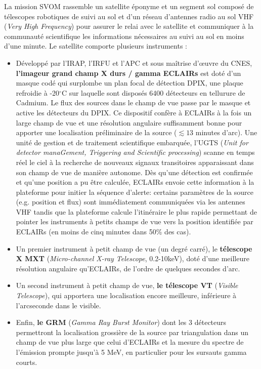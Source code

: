 \documentclass[11pt,onecolumn]{article}
\makeatletter
\newcommand*{\eg}{e.g.\@\xspace}
\makeatother
\begin{document}
La mission SVOM rassemble un satellite éponyme et un segment sol composé de télescopes robotiques de suivi au sol et d'un réseau d'antennes radio au sol VHF (\textit{Very High Frequency}) pour assurer le relai avec le satellite et communiquer à la communauté scientifique les informations nécessaires au suivi au sol en moins d'une minute. Le satellite comporte plusieurs instruments :

\begin{itemize}
\setlength\itemsep{0em}
\item Développé par l'IRAP, l'IRFU et l'APC et sous ma\^itrise d'\oe uvre du CNES, \textbf{l'imageur grand champ X durs / gamma ECLAIRs} est doté d'un masque codé qui surplombe un plan focal de détection DPIX, une plaque refroidie à -20$^{\circ}$C sur laquelle sont disposés 6400 détecteurs en tellurure de Cadmium. Le flux des sources dans le champ de vue passe par le masque et active les détecteurs du DPIX. Ce dispositif confère à ECLAIRs à la fois un large champ de vue et une résolution angulaire suffisamment bonne pour apporter une localisation préliminaire de la source ($\lesssim13$ minutes d'arc). Une unité de gestion et de traitement scientifique embarquée, l'UGTS (\textit{Unit for detector manaGement, Triggering and Scientific processing}) scanne en temps réel le ciel à la recherche de nouveaux signaux transitoires apparaissant dans son champ de vue de manière autonome. Dès qu'une détection est confirmée et qu'une position a pu être calculée, ECLAIRs envoie cette information à la plateforme pour initier la séquence d'alerte: certains paramètres de la source (\eg position et flux) sont immédiatement communiquées via les antennes VHF tandis que la plateforme calcule l'itinéraire le plus rapide permettant de pointer les instruments à petits champs de vue vers la position identifiée par ECLAIRs (en moins de cinq minutes dans 50\% des cas).
\item Un premier instrument à petit champ de vue (un degré carré), le \textbf{télescope X MXT} (\textit{Micro-channel X-ray Telescope}, 0.2-10keV), doté d'une meilleure résolution angulaire qu'ECLAIRs, de l'ordre de quelques secondes d'arc. %
\item Un second instrument à petit champ de vue, \textbf{le télescope VT} (\textit{Visible Telescope}), qui apportera une localisation encore meilleure, inférieure à l'arcseconde dans le visible. %
\item Enfin, \textbf{le GRM} (\textit{Gamma Ray Burst Monitor}) dont les 3 détecteurs permettront la localisation grossière de la source par triangulation dans un champ de vue plus large que celui d'ECLAIRs et la mesure du spectre de l'émission prompte jusqu'à 5 MeV, en particulier pour les sursauts gamma courts. %
\end{itemize}
\end{document}
